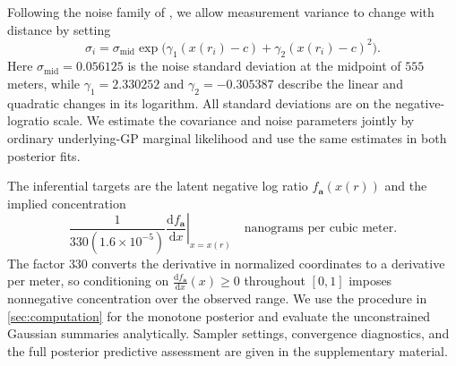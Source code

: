Following the noise family of \citet{holst1996lidar}, we allow
measurement variance to change with distance by setting
\[
 \sigma_i=\sigma_{\mathrm{mid}}
 \exp\bigl(\gamma_1(x(r_i)-c)+\gamma_2(x(r_i)-c)^2\bigr).
\]
Here $\sigma_{\mathrm{mid}}=0.056125$ is the noise standard deviation
at the midpoint of $555$ meters, while $\gamma_1=2.330252$ and
$\gamma_2=-0.305387$ describe the linear and quadratic changes in
its logarithm. All standard deviations are on the negative-logratio
scale. We estimate the covariance and noise parameters jointly by
ordinary underlying-GP marginal likelihood and use the same estimates
in both posterior fits.

The inferential targets are the latent negative log ratio
$f_{\boldsymbol{a}}(x(r))$ and the implied concentration
\[
 \frac{1}{330(1.6\times10^{-5})}\left.\frac{\mathrm{d}f_{\boldsymbol{a}}}{\mathrm{d}x}\right|_{x=x(r)}
 \quad\text{nanograms per cubic meter}.
\]
The factor $330$ converts the derivative in normalized coordinates to
a derivative per meter, so conditioning on $\frac{\mathrm{d}f_{\boldsymbol{a}}}{\mathrm{d}x}(x)\geq0$
throughout $[0,1]$ imposes nonnegative concentration over
the observed range. We use the procedure in \cref{sec:computation}
for the monotone posterior and evaluate the unconstrained Gaussian
summaries analytically. Sampler settings, convergence diagnostics, and
the full posterior predictive assessment are given in the supplementary
material.


